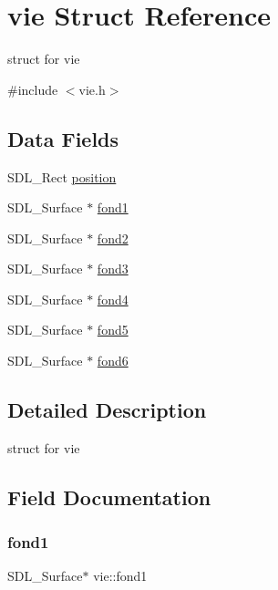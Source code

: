 \hypertarget{structvie}{}\section{vie Struct Reference}
\label{structvie}


struct for vie  




{\ttfamily \#include $<$vie.\+h$>$}

\subsection*{Data Fields}
\begin{DoxyCompactItemize}
\item 
S\+D\+L\+\_\+\+Rect \hyperlink{structvie_a916050892cf1e7b8039952dcafa44825}{position}
\item 
S\+D\+L\+\_\+\+Surface $\ast$ \hyperlink{structvie_a7616ae8ecc97b7fb2d92be6a858014ad}{fond1}
\item 
S\+D\+L\+\_\+\+Surface $\ast$ \hyperlink{structvie_a6ecad7f4161cb602faa27d2de9e3ee50}{fond2}
\item 
S\+D\+L\+\_\+\+Surface $\ast$ \hyperlink{structvie_a9763ef794bb12262f5826b911d20e42b}{fond3}
\item 
S\+D\+L\+\_\+\+Surface $\ast$ \hyperlink{structvie_a0b08072b8c7ec9e1adfd6e26b4fcb39f}{fond4}
\item 
S\+D\+L\+\_\+\+Surface $\ast$ \hyperlink{structvie_adabeccdf7e33dd53ac6d85a24fc3931d}{fond5}
\item 
S\+D\+L\+\_\+\+Surface $\ast$ \hyperlink{structvie_afe9825545f1294799e27a037803d79b0}{fond6}
\end{DoxyCompactItemize}


\subsection{Detailed Description}
struct for vie 

\subsection{Field Documentation}
\mbox{\label{structvie_a7616ae8ecc97b7fb2d92be6a858014ad}} 
\subsubsection{\texorpdfstring{fond1}{fond1}}
{\footnotesize\ttfamily S\+D\+L\+\_\+\+Surface$\ast$ vie\+::fond1}

